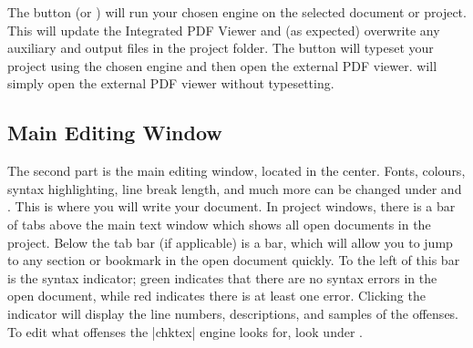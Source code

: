 The  button (or ) will run your chosen engine on the selected document or project. This will update the Integrated PDF Viewer and (as expected) overwrite any auxiliary and output files in the project folder. The  button will typeset your project using the chosen engine and then open the external PDF viewer.  will simply open the external PDF viewer without typesetting.

\subsection{Main Editing Window}

The second part is the main editing window, located in the center. Fonts, colours, syntax highlighting, line break length, and much more can be changed under  and . This is where you will write your document. In project windows, there is a bar of tabs above the main text window which shows all open documents in the project. Below the tab bar (if applicable) is a  bar, which will allow you to jump to any section or bookmark in the open document quickly. To the left of this bar is the syntax indicator; green indicates that there are no syntax errors in the open document, while red indicates there is at least one error. Clicking the indicator will display the line numbers, descriptions, and samples of the offenses. To edit what offenses the |chktex| engine looks for, look under .

